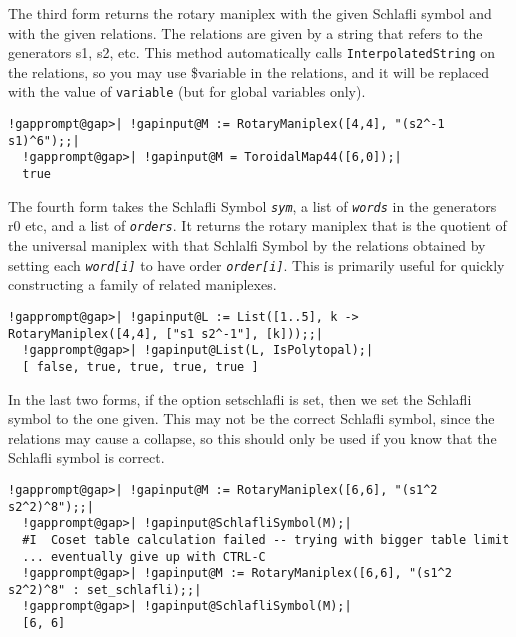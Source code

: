 \documentclass[a4paper,11pt]{report}
\begin{document}
{{{ The third form returns the rotary maniplex with the given Schlafli symbol and
with the given relations. The relations are given by a string that refers to
the generators s1, s2, etc. This method automatically calls \texttt{InterpolatedString} on the relations, so you may use \$variable in the relations, and it will be
replaced with the value of \texttt{variable} (but for global variables only). 
\begin{Verbatim}[commandchars=!@|,fontsize=\small,frame=single,label=Example]
  !gapprompt@gap>| !gapinput@M := RotaryManiplex([4,4], "(s2^-1 s1)^6");;|
  !gapprompt@gap>| !gapinput@M = ToroidalMap44([6,0]);|
  true
\end{Verbatim}
 

 The fourth form takes the Schlafli Symbol \mbox{\texttt{\mdseries\slshape sym}}, a list of \mbox{\texttt{\mdseries\slshape words}} in the generators r0 etc, and a list of \mbox{\texttt{\mdseries\slshape orders}}. It returns the rotary maniplex that is the quotient of the universal
maniplex with that Schlalfi Symbol by the relations obtained by setting each \mbox{\texttt{\mdseries\slshape word[i]}} to have order \mbox{\texttt{\mdseries\slshape order[i]}}. This is primarily useful for quickly constructing a family of related
maniplexes. }

 
\begin{Verbatim}[commandchars=!@|,fontsize=\small,frame=single,label=Example]
  !gapprompt@gap>| !gapinput@L := List([1..5], k -> RotaryManiplex([4,4], ["s1 s2^-1"], [k]));;|
  !gapprompt@gap>| !gapinput@List(L, IsPolytopal);|
  [ false, true, true, true, true ]
\end{Verbatim}
 

 In the last two forms, if the option set{\textunderscore}schlafli is set, then
we set the Schlafli symbol to the one given. This may not be the correct
Schlafli symbol, since the relations may cause a collapse, so this should only
be used if you know that the Schlafli symbol is correct. 
\begin{Verbatim}[commandchars=!@|,fontsize=\small,frame=single,label=Example]
  !gapprompt@gap>| !gapinput@M := RotaryManiplex([6,6], "(s1^2 s2^2)^8");;|
  !gapprompt@gap>| !gapinput@SchlafliSymbol(M);|
  #I  Coset table calculation failed -- trying with bigger table limit
  ... eventually give up with CTRL-C
  !gapprompt@gap>| !gapinput@M := RotaryManiplex([6,6], "(s1^2 s2^2)^8" : set_schlafli);;|
  !gapprompt@gap>| !gapinput@SchlafliSymbol(M);|
  [6, 6]
\end{Verbatim}
 

}}
\end{document}
